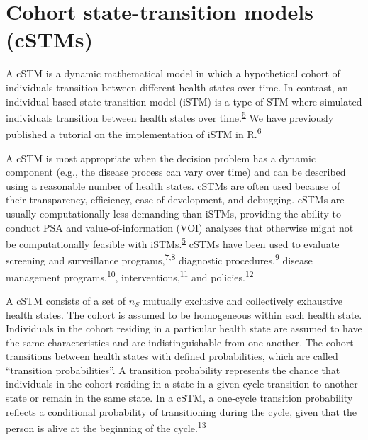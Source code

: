 \documentclass[
]{article}
\begin{document}
\hypertarget{cohort-state-transition-models-cstms}{%
\section{Cohort state-transition models (cSTMs)}\label{cohort-state-transition-models-cstms}}

A cSTM is a dynamic mathematical model in which a hypothetical cohort of individuals transition between different health states over time. In contrast, an individual-based state-transition model (iSTM) is a type of STM where simulated individuals transition between health states over time.\textsuperscript{\protect\hyperlink{ref-Siebert2012c}{5}} We have previously published a tutorial on the implementation of iSTM in R.\textsuperscript{\protect\hyperlink{ref-Krijkamp2018}{6}}

A cSTM is most appropriate when the decision problem has a dynamic component (e.g., the disease process can vary over time) and can be described using a reasonable number of health states. cSTMs are often used because of their transparency, efficiency, ease of development, and debugging. cSTMs are usually computationally less demanding than iSTMs, providing the ability to conduct PSA and value-of-information (VOI) analyses that otherwise might not be computationally feasible with iSTMs.\textsuperscript{\protect\hyperlink{ref-Siebert2012c}{5}} cSTMs have been used to evaluate screening and surveillance programs,\textsuperscript{\protect\hyperlink{ref-Suijkerbuijk2018}{7},\protect\hyperlink{ref-Sathianathen2018a}{8}} diagnostic procedures,\textsuperscript{\protect\hyperlink{ref-Lu2018b}{9}} disease management programs,\textsuperscript{\protect\hyperlink{ref-Djatche2018}{10}}, interventions,\textsuperscript{\protect\hyperlink{ref-Smith-Spangler2010}{11}} and policies.\textsuperscript{\protect\hyperlink{ref-Pershing2014}{12}}

A cSTM consists of a set of \(n_S\) mutually exclusive and collectively exhaustive health states. The cohort is assumed to be homogeneous within each health state. Individuals in the cohort residing in a particular health state are assumed to have the same characteristics and are indistinguishable from one another. The cohort transitions between health states with defined probabilities, which are called ``transition probabilities''. A transition probability represents the chance that individuals in the cohort residing in a state in a given cycle transition to another state or remain in the same state. In a cSTM, a one-cycle transition probability reflects a conditional probability of transitioning during the cycle, given that the person is alive at the beginning of the cycle.\textsuperscript{\protect\hyperlink{ref-Miller1994}{13}}
\end{document}
